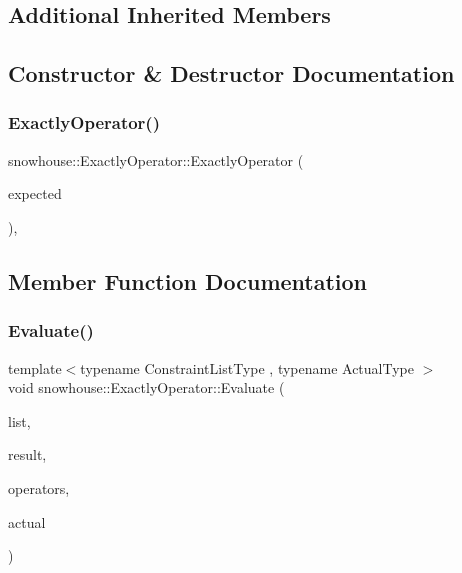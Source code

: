 \subsection*{Additional Inherited Members}


\subsection{Constructor \& Destructor Documentation}
\mbox{\label{structsnowhouse_1_1ExactlyOperator_ad41743f3689a619a955064697850750d}} 
\subsubsection{\texorpdfstring{ExactlyOperator()}{ExactlyOperator()}}
{\footnotesize\ttfamily snowhouse\+::\+Exactly\+Operator\+::\+Exactly\+Operator (\begin{DoxyParamCaption}\item[{unsigned int}]{expected }\end{DoxyParamCaption})\hspace{0.3cm}{\ttfamily [inline]}, {\ttfamily [explicit]}}



\subsection{Member Function Documentation}
\mbox{\label{structsnowhouse_1_1ExactlyOperator_a7e801c5875cc639bb87b0cb579c698d1}} 
\subsubsection{\texorpdfstring{Evaluate()}{Evaluate()}}
{\footnotesize\ttfamily template$<$typename Constraint\+List\+Type , typename Actual\+Type $>$ \\
void snowhouse\+::\+Exactly\+Operator\+::\+Evaluate (\begin{DoxyParamCaption}\item[{Constraint\+List\+Type \&}]{list,  }\item[{\mbox{\hyperlink{namespacesnowhouse_a719169b1315a13161c15f25e600a8f51}{Result\+Stack}} \&}]{result,  }\item[{\mbox{\hyperlink{namespacesnowhouse_adcb10e215e6a4bbcb35722a9c7270fc6}{Operator\+Stack}} \&}]{operators,  }\item[{const Actual\+Type \&}]{actual }\end{DoxyParamCaption})\hspace{0.3cm}{\ttfamily [inline]}}



